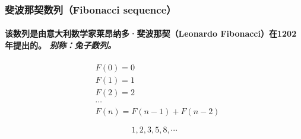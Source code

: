 \documentclass[aspectratio=169]{ctexbeamer}
\begin{document}
\begin{frame}
\frametitle{斐波那契数列（Fibonacci sequence）}
\framesubtitle{该数列是由意大利数学家莱昂纳多·斐波那契（Leonardo Fibonacci）在1202年提出的。 \textit{别称：兔子数列。}}

\begin{definition}
\[
\begin{aligned}
&F(0)=0 \\
&F(1)=1 \\
&F(2)=2 \\
&\cdots \\
&F(n)=F(n-1)+F(n-2)
\end{aligned}
\]
\end{definition}

\begin{examples}
\[
1, 2, 3, 5, 8, \cdots
\]
\end{examples}

\end{frame}
\end{document}
